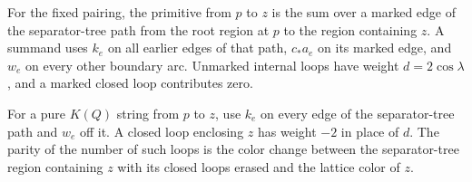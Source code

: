 \begin{lemma}
\label{lem:calc-tree-evaluation}
For the fixed pairing, the primitive from $p$ to $z$ is the sum over a
marked edge of the separator-tree path from the root region at $p$ to
the region containing $z$.  A summand uses $k_e$ on all earlier edges
of that path, $c_*a_e$ on its marked edge, and $w_e$ on every other
boundary arc.  Unmarked internal loops have weight
$d=2\cos\lambda$, and a marked closed loop contributes zero.

For a pure $K(Q)$ string from $p$ to $z$, use $k_e$ on every edge of
the separator-tree path and $w_e$ off it.  A closed loop enclosing $z$
has weight $-2$ in place of $d$.  The parity of the number of such
loops is the color change between the separator-tree region containing
$z$ with its closed loops erased and the lattice color of $z$.
\end{lemma}

